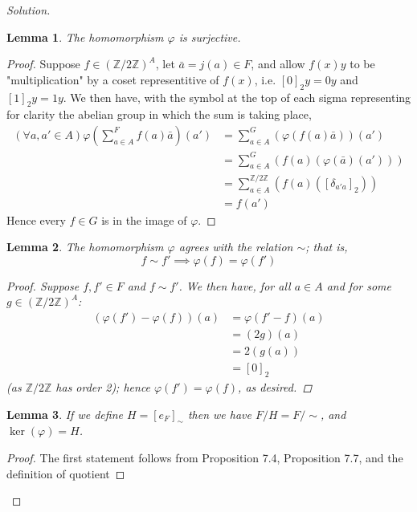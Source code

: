 \documentclass[12pt]{article}
\newenvironment{solution}
  {\renewcommand\qedsymbol{$\blacksquare$}\begin{proof}[Solution]}
{\end{proof}}
\newenvironment{sproof}{
  \renewcommand\qedsymbol{$\square$}
  \begin{proof}
  }{
  \end{proof}
}
\newtheorem{lemma}{Lemma}
\theoremstyle{remark}
\begin{document}
\begin{solution}
  \begin{lemma}
    The homomorphism $\varphi$ is surjective.
  \end{lemma}
  \begin{sproof}
    Suppose $f\in (\mathbb{Z}/2\mathbb{Z})^A$, let $\bar{a} = j(a) \in F$, and allow 
    $f(x)y$ to be "multiplication" by a coset representitive of $f(x)$, i.e. 
    $[0]_2y= 0y$ and $[1]_2y = 1y$.
    We then have, with the symbol at the top of each sigma representing for clarity the abelian group
    in which the sum is taking place,
    \begin{align*}
      (\forall a,a'\in A) \varphi\left( \sum_{a\in A}^{F} f(a)\bar{a} \right)(a')
      &= \sum_{a\in A}^{G} \left( \varphi(f(a)\bar{a}) \right)(a') \\
      &= \sum_{a\in A}^{G} \left( f(a)(\varphi(\bar{a})(a')) \right) \\
      &= \sum_{a\in A}^{\mathbb{Z}/2\mathbb{Z}} \left( f(a)([\delta_{a'a}]_2) \right) \\
      &= f(a')
    \end{align*}
    Hence every $f\in G$ is in the image of $\varphi$.
  \end{sproof}
  \begin{lemma}
    The homomorphism $\varphi$ agrees with the relation $\sim$; that is, 
    \begin{equation*}
      f\sim f'\implies \varphi(f) = \varphi(f')
    \end{equation*}
    \begin{sproof}
      Suppose $f,f'\in F$ and $f\sim f'$.
      We then have, for all $a\in A$ and for some $g\in (\mathbb{Z}/2\mathbb{Z})^A$:
      \begin{align*}
        (\varphi(f') - \varphi(f))(a) &= \varphi(f'-f)(a) \\
        &= (2g)(a) \\
        &= 2(g(a)) \\
        &= [0]_2
      \end{align*}
      (as $\mathbb{Z}/2\mathbb{Z}$ has order 2); hence $\varphi(f') = \varphi(f)$, as desired.
    \end{sproof}
  \end{lemma}
  \begin{lemma}
    If we define $H = [e_F]_{\sim}$ then we have $F/H = F/{\sim}$, and $\ker(\varphi) = H$.
  \end{lemma}
  \begin{sproof}
    The first statement follows from Proposition 7.4, Proposition 7.7, and the definition of quotient

\end{sproof}
\end{solution}
\end{document}
